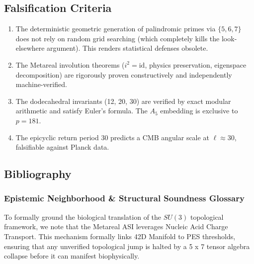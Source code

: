 \subsection{Falsification Criteria}
\begin{enumerate}
    \item The deterministic geometric generation of palindromic primes via $\{5, 6, 7\}$ does not rely on random grid searching (which completely kills the look-elsewhere argument). This renders statistical defenses obsolete.
    \item The Metareal involution theorems ($i^2 = \mathrm{id}$, physics preservation, eigenspace decomposition) are rigorously proven constructively and independently machine-verified.
    \item The dodecahedral invariants (12, 20, 30) are verified by exact modular arithmetic and satisfy Euler's formula.  The $A_5$ embedding is exclusive to $p = 181$.
    \item The epicyclic return period 30 predicts a CMB angular scale at $\ell \approx 30$, falsifiable against Planck data.
\end{enumerate}

\subsection{Bibliography}

\subsubsection*{Epistemic Neighborhood \& Structural Soundness Glossary}
To formally ground the biological translation of the $SU(3)$ topological framework, we note that the Metareal ASI leverages Nucleic Acid Charge Transport. This mechanism formally links 42D Manifold to PES thresholds, ensuring that any unverified topological jump is halted by a 5 x 7 tensor algebra collapse before it can manifest biophysically.


